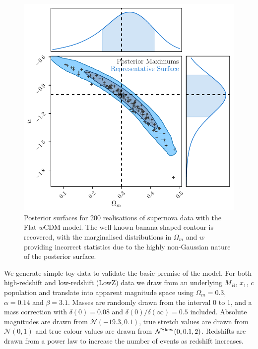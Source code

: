 \documentclass[a4paper,fleqn,usenatbib]{mnras}
\begin{document}
\begin{figure}
	\begin{center}
		\includegraphics[width=\columnwidth]{simpleApproximateModelW.pdf}
	\end{center}
	\caption{Posterior surfaces for 200 realisations of supernova data with the Flat $w$CDM model. The well known banana shaped contour is recovered, with the marginalised distributions in $\Omega_m$ and $w$ providing incorrect statistics due to the highly non-Gaussian nature of the posterior surface.}
	\label{fig:simple_w}
\end{figure}

We generate simple toy data to validate the basic premise of the model. For both high-redshift and low-redshift (LowZ) data we draw from an underlying $M_B$, $x_1$, $c$ population and translate into apparent magnitude space using $\Omega_m = 0.3$, $\alpha= 0.14$ and $\beta = 3.1$. Masses are randomly drawn from the interval 0 to 1, and a mass correction with $\delta(0) = 0.08$ and $\delta(0)/\delta(\infty) =0.5$ included. Absolute magnitudes are drawn from $\mathcal{N}(-19.3, 0.1)$, true stretch values are drawn from $\mathcal{N}(0, 1)$ and true colour values are drawn from $\mathcal{N}^{\rm Skew}(0, 0.1, 2)$. Redshifts are drawn from a power law to increase the number of events as redshift increases. 
\end{document}
